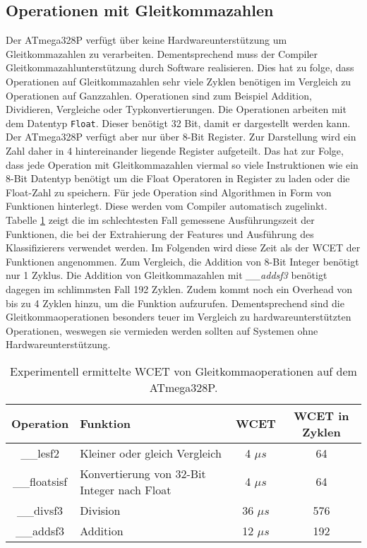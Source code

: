 \subsection{Operationen mit Gleitkommazahlen}
Der ATmega328P verfügt über keine Hardwareunterstützung um Gleitkommazahlen zu verarbeiten. Dementsprechend muss der Compiler Gleitkommazahlunterstützung durch Software realisieren. Dies hat zu folge, dass Operationen
auf Gleitkommazahlen sehr viele Zyklen benötigen im Vergleich zu Operationen auf Ganzzahlen. Operationen sind zum Beispiel Addition, Dividieren, Vergleiche oder Typkonvertierungen.
\newline
\newline
Die Operationen arbeiten mit dem Datentyp \texttt{Float}. Dieser benötigt 32 Bit, damit er dargestellt werden kann. Der ATmega328P verfügt aber nur über 8-Bit Register. Zur Darstellung wird ein Zahl daher in 4 hintereinander
liegende Register aufgeteilt. Das hat zur Folge, dass jede Operation mit Gleitkommazahlen viermal so viele Instruktionen wie ein 8-Bit Datentyp benötigt um die Float Operatoren in Register zu laden oder die
Float-Zahl zu speichern.
\newline
\newline
Für jede Operation sind Algorithmen in Form von Funktionen hinterlegt. Diese werden vom Compiler automatisch zugelinkt. Tabelle \ref{tab:float_operations} zeigt die im schlechtesten Fall gemessene Ausführungszeit
der Funktionen, die bei der Extrahierung der Features und Ausführung des Klassifizierers verwendet werden. Im Folgenden wird diese Zeit als der WCET der Funktionen angenommen.
Zum Vergleich, die Addition von 8-Bit Integer benötigt nur 1 Zyklus. Die Addition von Gleitkommazahlen mit \textit{\_\_addsf3} benötigt dagegen im schlimmsten Fall 192 Zyklen. Zudem kommt noch ein
Overhead von bis zu 4 Zyklen hinzu, um die Funktion aufzurufen. Dementsprechend sind die Gleitkommaoperationen besonders teuer im Vergleich zu hardwareunterstützten Operationen, weswegen sie vermieden
werden sollten auf Systemen ohne Hardwareunterstützung.
\begin{table}[h!]
    \centering
    \begin{tabular}{ | c | l | c | c |}
        \hline
        Operation & Funktion & WCET & WCET in Zyklen \\\hline
        \_\_lesf2 & Kleiner oder gleich Vergleich & 4 $\mu s$ & 64 \\\hline
        \_\_floatsisf & Konvertierung von 32-Bit Integer nach Float & 4 $\mu s$ & 64 \\\hline
        \_\_divsf3 & Division & 36 $\mu s$ & 576 \\\hline
        \_\_addsf3 & Addition & 12 $\mu s$ & 192 \\\hline
    \end{tabular}
    \caption{Experimentell ermittelte WCET von Gleitkommaoperationen auf dem ATmega328P.}
    \label{tab:float_operations}
\end{table}